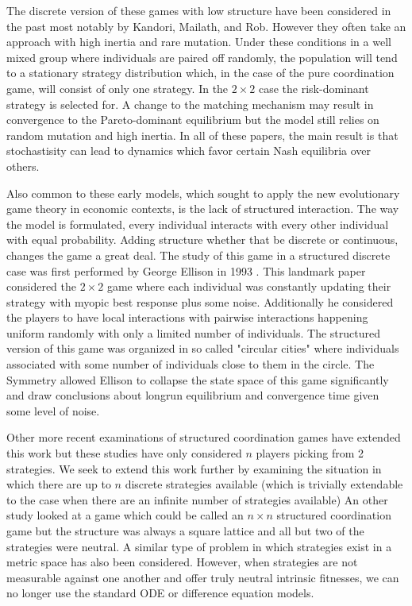 \documentclass[]{article}
\begin{document}
The discrete version of these games with low structure have been considered in the past \cite{Kandori1993,Kandori1995} most notably by Kandori, Mailath, and Rob. However they often take an approach with high inertia and rare mutation. Under these conditions in a well mixed group where individuals are paired off randomly, the population will tend to a stationary strategy distribution which, in the case of the pure coordination game, will consist of only one strategy. In the $2\times 2$ case the risk-dominant strategy is selected for. A change to the matching mechanism may result in convergence to the Pareto-dominant equilibrium \cite{Robson1995} but the model still relies on random mutation and high inertia. In all of these papers, the main result is that stochastisity can lead to dynamics which favor certain Nash equilibria over others.  

Also common to these early models, which sought to apply the new evolutionary game theory in economic contexts, is the lack of structured interaction. The way the model is formulated, every individual interacts with every other individual with equal probability. Adding structure whether that be discrete or continuous, changes the game a great deal. The study of this game in a structured discrete case was first performed by George Ellison in 1993 \cite{Ellison1993}. This landmark paper considered the $2\times2$ game where each individual was constantly updating their strategy with myopic best response plus some noise. Additionally he considered the players to have local interactions with pairwise interactions happening uniform randomly with only a limited number of individuals. The structured version of this game was organized in so called "circular cities" where individuals associated with some number of individuals close to them in the circle. The Symmetry allowed Ellison to collapse the state space of this game significantly and draw conclusions about longrun equilibrium and convergence time given some level of noise.   

Other more recent examinations of structured coordination games have extended this work \cite{Buskens2016, Tomassini2010} but these studies have only considered $n$ players picking from 2 strategies. We seek to extend this work further by examining the situation in which there are up to $n$ discrete strategies available (which is trivially extendable to the case when there are an infinite number of strategies available)
An other study looked at a game which could be called an $n\times n$ structured coordination game\cite{Szabo2016} but the structure was always a square lattice and all but two of the strategies were neutral.
A similar type of problem in which strategies exist in a metric space has also been considered. %
However, when strategies are not measurable against one another and offer truly neutral intrinsic fitnesses, we can no longer use the standard ODE or difference equation models.
\end{document}
